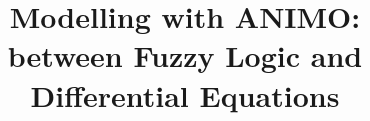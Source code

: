 \documentclass{bmcart}
\begin{document}
\begin{frontmatter}

\begin{fmbox}

\title{Modelling with ANIMO:\\ between Fuzzy Logic and Differential Equations}


\author[
   addressref={aff1},                   %
   noteref={n1},                        %
   email={s.schivo@utwente.nl}   %
]{~}
\author[
   addressref={aff2},
   noteref={n1},
   email={j.scholma@utwente.nl}
]{~}
\author[
   addressref={aff3},
   email={p.e.vandervet@utwente.nl}
]{~}
\author[
   addressref={aff2},
   email={h.b.j.karperien@utwente.nl}
]{~}
\author[
   addressref={aff2},
   email={j.n.post@utwente.nl}
]{~}
\author[
   addressref={aff1},
   email={j.c.vandepol@utwente.nl}
]{~}
\author[
   addressref={aff1},
   corref={aff1},
   email={r.langerak@utwente.nl}
]{~}



\end{fmbox}
\end{frontmatter}
\end{document}
